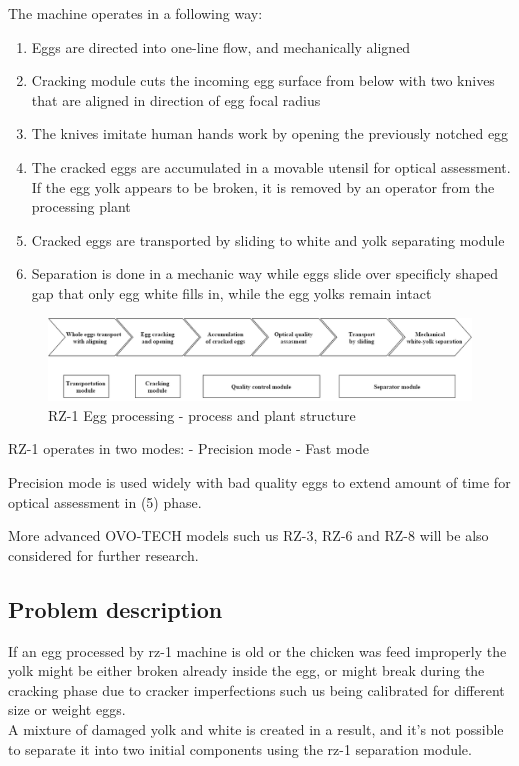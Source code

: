 \documentclass[12pt,twoside,a4paper]{article}
\begin{document}
The machine operates in a following way:
\begin{enumerate}
\item Eggs are directed into one-line flow, and mechanically aligned

\item Cracking module cuts the incoming egg surface from below with two knives that are aligned in direction of egg focal radius
\item The knives imitate human hands work by opening the previously notched egg
\item The cracked eggs are accumulated in a movable utensil for optical assessment. 
If the egg yolk appears to be broken, it is removed by an operator from the processing plant
\item Cracked eggs are transported by sliding to white and yolk separating module
\item Separation  is done in a mechanic way while eggs slide over specificly shaped gap that only egg white fills in, while the egg yolks remain intact
\end{enumerate}

\begin{figure}[H]
\centering
\includegraphics[width=0.8\paperwidth]{process}
\caption{RZ-1 Egg processing  - process and plant structure}

\end{figure}

RZ-1 operates in two modes:
- Precision mode
- Fast mode

Precision mode is used widely with bad quality eggs to extend amount of time for optical assessment in (5) phase.

More advanced OVO-TECH models such us RZ-3, RZ-6 and RZ-8 will be also considered for further research.

\subsection{Problem description}

If an egg processed by rz-1 machine is old or the chicken was feed improperly the yolk might be either broken already inside the egg, or might break during the cracking  phase due to cracker imperfections such us being calibrated for different size or weight eggs.\\
A mixture of damaged yolk and white is created in a result, and it’s not possible to separate it into two initial components using  the rz-1 separation  module.
\end{document}
